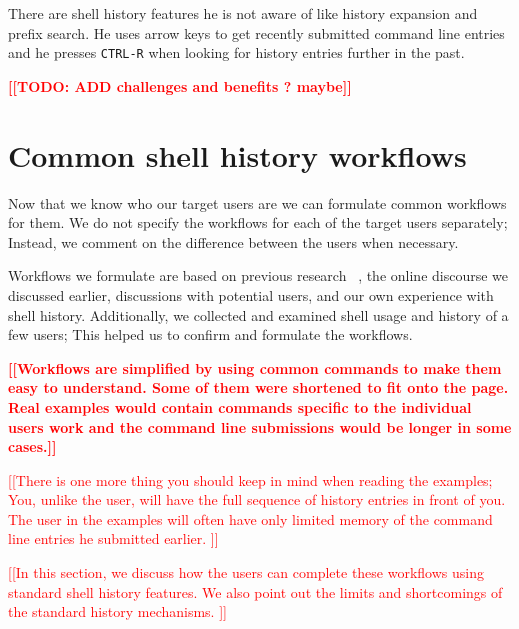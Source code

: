 \documentclass[thesis=M,english]{FITthesis}[2012/10/20]
\newcommand{\todotext}[1]{\textcolor{red}{\textbf{[[#1]]}}}
\newcommand{\redtext}[1]{\textcolor{red}{[[#1]]}}
\let\myCite\cite
\renewcommand\cite{\unskip~\myCite}
\begin{document}
There are shell history features he is not aware of like history expansion and prefix search. He uses arrow keys to get recently submitted command line entries and he presses \verb|CTRL-R| when looking for history entries further in the past. 

\todotext{TODO: ADD challenges and benefits ? maybe}


\section{Common shell history workflows}

Now that we know who our target users are we can formulate common workflows for them. We do not specify the workflows for each of the target users separately; Instead, we comment on the difference between the users when necessary. 

Workflows we formulate are based on previous research \cite{greenberg1993computer}, the online discourse we discussed earlier, discussions with potential users, and our own experience with shell history. Additionally, we collected and examined shell usage and history of a few users; This helped us to confirm and formulate the workflows.

\todotext{Workflows are simplified by using common commands to make them easy to understand. Some of them were shortened to fit onto the page. Real examples would contain commands specific to the individual users work and the command line submissions would be longer in some cases.}

\redtext{There is one more thing you should keep in mind when reading the examples; You, unlike the user, will have the full sequence of history entries in front of you. The user in the examples will often have only limited memory of the command line entries he submitted earlier. }



\redtext{In this section, we discuss how the users can complete these workflows using standard shell history features. We also point out the limits and shortcomings of the standard history mechanisms. }




\end{document}

